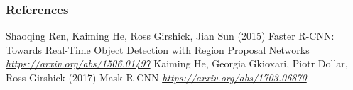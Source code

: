 % 
% 






\begin{vbframe}
\frametitle{References}
\footnotesize{
\begin{thebibliography}{99}

 Shaoqing Ren, Kaiming He, Ross Girshick, Jian Sun (2015)
\newblock Faster R-CNN: Towards Real-Time Object Detection with Region Proposal Networks
\newblock \emph{\url{https://arxiv.org/abs/1506.01497}}
 Kaiming He, Georgia Gkioxari, Piotr Dollar, Ross Girshick (2017)
\newblock Mask R-CNN
\newblock \emph{\url{https://arxiv.org/abs/1703.06870}}


\end{thebibliography}
}
\end{vbframe}
\endlecture
